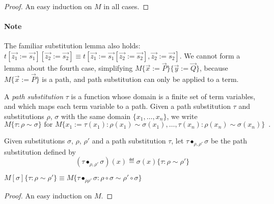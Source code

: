 \begin{proof}
An easy induction on $M$ in all cases.
\end{proof}

\paragraph{Note}
The familiar substitution lemma also holds: $t [\vec{z_1} := \vec{s_1}] [\vec{z_2} := \vec{s_2}] \equiv t [\vec{z_1} := \vec{s_1}[\vec{z_2} := \vec{s_2}], 
\vec{z_2} := \vec{s_2}]$.  We cannot form a lemma about the fourth case, simplifying $M \{ \vec{x} := \vec{P} \} \{ \vec{y} := \vec{Q} \}$, because
$M \{ \vec{x} := \vec{P} \}$ is a path, and path substitution can only be applied to a term.

\begin{definition}
A \emph{path substitution} $\tau$ is a function whose domain is a finite set of term variables,
and which maps each term variable to a path.  Given a path substitution $\tau$ and substitutions $\rho$, $\sigma$
with the same domain $\{ x_1, \ldots, x_n \}$, we write
\[ M \{ \tau : \rho \sim \sigma \} \text{ for } M \{ x_1 := \tau(x_1) : \rho(x_1) \sim \sigma(x_1), \ldots, \tau(x_n) : \rho(x_n) \sim \sigma(x_n) \} \enspace . \]

Given substitutions $\sigma$, $\rho$, $\rho'$ and a path substitution $\tau$, let $\tau \bullet_{\rho, \rho'} \sigma$ be the path substitution defined by
\[ (\tau \bullet_{\rho, \rho'} \sigma)(x) \eqdef \sigma(x)\{ \tau : \rho \sim \rho' \} \]
\end{definition}

\begin{lemma}
$M[\sigma]\{ \tau : \rho \sim \rho' \} \equiv
M\{ \tau \bullet_{\rho \rho'} \sigma : \rho \circ \sigma \sim \rho' \circ \sigma \}$
\end{lemma}

\begin{proof}
An easy induction on $M$.
\end{proof}